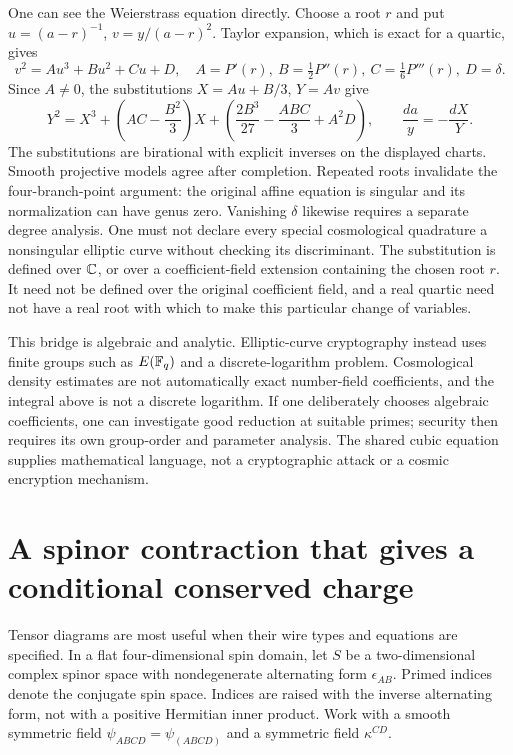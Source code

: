 One can see the Weierstrass equation directly. Choose a root $r$ and put
$u=(a-r)^{-1}$, $v=y/(a-r)^2$. Taylor expansion, which is exact for a
quartic, gives
\[
 v^2=A u^3+B u^2+C u+D,
 \quad A=P'(r),\ B=\tfrac12P''(r),\ C=\tfrac16P'''(r),\ D=\delta.
\]
Since $A\ne0$, the substitutions $X=Au+B/3$, $Y=Av$ give
\begin{equation}
 Y^2=X^3+\left(AC-\frac{B^2}{3}\right)X
 +\left(\frac{2B^3}{27}-\frac{ABC}{3}+A^2D\right),
 \qquad \frac{da}{y}=-\frac{dX}{Y}.
 \label{eq:cc-weierstrass}
\end{equation}
The substitutions are birational with explicit inverses on the displayed
charts. Smooth projective models agree after completion. Repeated roots
invalidate the four-branch-point argument: the original affine equation
is singular and its normalization can have genus zero. Vanishing
$\delta$ likewise requires a separate degree analysis. One must not
declare every special cosmological quadrature a nonsingular elliptic
curve without checking its discriminant.
The substitution is defined over $\mathbb{C}$, or over a coefficient-field
extension containing the chosen root $r$. It need not be defined over
the original coefficient field, and a real quartic need not have a real
root with which to make this particular change of variables.

This bridge is algebraic and analytic. Elliptic-curve cryptography instead
uses finite groups such as $E(\mathbb{F}_q)$ and a discrete-logarithm problem.
Cosmological density estimates are not automatically exact number-field
coefficients, and the integral above is not a discrete logarithm. If one
deliberately chooses algebraic coefficients, one can investigate good
reduction at suitable primes; security then requires its own group-order
and parameter analysis. The shared cubic equation supplies mathematical
language, not a cryptographic attack or a cosmic encryption mechanism.

\section{A spinor contraction that gives a conditional conserved charge}

Tensor diagrams are most useful when their wire types and equations are
specified. In a flat four-dimensional spin domain, let $S$ be a
two-dimensional complex spinor space with nondegenerate alternating form
$\epsilon_{AB}$. Primed indices denote the conjugate spin space. Indices
are raised with the inverse alternating form, not with a positive
Hermitian inner product. Work with a smooth symmetric field
$\psi_{ABCD}=\psi_{(ABCD)}$ and a symmetric field $\kappa^{CD}$.

